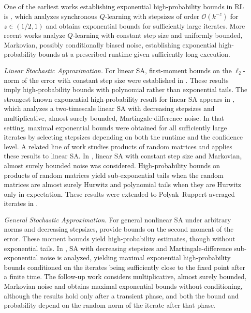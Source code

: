 \documentclass{article}
\begin{document}
One of the earliest works establishing exponential high-probability bounds in RL is \citet{even2003learning}, which analyzes synchronous $Q$-learning with stepsizes of order $\mathcal{O}(k^{-z})$ for $z\in(1/2,1)$ and obtains exponential bounds for sufficiently large iterates. More recent works \citep{li2020sample,li2021q,li2024q} analyze $Q$-learning with constant step size and uniformly bounded, Markovian, possibly conditionally biased noise, establishing exponential high-probability bounds at a prescribed runtime given sufficiently long execution. 

\textit{Linear Stochastic Approximation.}
For linear SA, first-moment bounds on the $\ell_2$-norm of the error with constant step size were established in \citet{lakshminarayanan2018linear,srikant2019finite}. These results imply high-probability bounds with polynomial rather than exponential tails. The strongest known exponential high-probability result for linear SA appears in \citet{dalal2018general}, which analyzes a two-timescale linear SA with decreasing stepsizes and multiplicative, almost surely bounded, Martingale-difference noise. In that setting, maximal exponential bounds were obtained for all sufficiently large iterates by selecting stepsizes depending on both the runtime and the confidence level. A related line of work studies products of random matrices and applies these results to linear SA. In \citet{durmus2021tight}, linear SA with constant step size and Markovian, almost surely bounded noise was considered. High-probability bounds on products of random matrices yield sub-exponential tails when the random matrices are almost surely Hurwitz and polynomial tails when they are Hurwitz only in expectation. These results were extended to Polyak–Ruppert averaged iterates in \citet{durmusAveraged,Mou20}.



\textit{General Stochastic Approximation.}
For general nonlinear SA under arbitrary norms and decreasing stepsizes, \citet{chen2020finite,chen2019finitesample} provide bounds on the second moment of the error. These moment bounds yield high-probability estimates, though without exponential tails. In \citet{thoppe2019concentration}, SA with decreasing stepsizes and Martingale-difference sub-exponential noise is analyzed, yielding maximal exponential high-probability bounds conditioned on the iterates being sufficiently close to the fixed point after a finite time. The follow-up work \citep{chandak2022concentration} considers multiplicative, almost surely bounded, Markovian noise and obtains maximal exponential bounds without conditioning, although the results hold only after a transient phase, and both the bound and probability depend on the random norm of the iterate after that phase. 
\end{document}
